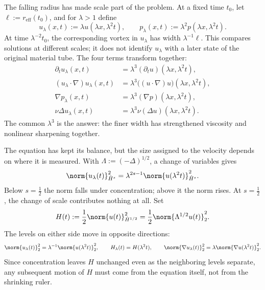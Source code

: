 
The falling radius has made scale part of the problem.
At a fixed time \(t_0\), let \(\ell:=r_{\mathrm{eff}}(t_0)\), and for \(\lambda>1\) define
\[
  u_\lambda(x,t)
  :=
  \lambda u(\lambda x,\lambda^2t),
  \qquad
  p_\lambda(x,t)
  :=
  \lambda^2p(\lambda x,\lambda^2t).
\]
At time \(\lambda^{-2}t_0\), the corresponding vortex in \(u_\lambda\) has width \(\lambda^{-1}\ell\).
This compares solutions at different scales; it does not identify \(u_\lambda\) with a later state of the original material tube.
The four terms transform together:
\[
\begin{aligned}
  \partial_tu_\lambda(x,t)
  &=
  \lambda^3(\partial_tu)(\lambda x,\lambda^2t),
  \\
  (u_\lambda\cdot\nabla)u_\lambda(x,t)
  &=
  \lambda^3\bigl((u\cdot\nabla)u\bigr)(\lambda x,\lambda^2t),
  \\
  \nabla p_\lambda(x,t)
  &=
  \lambda^3(\nabla p)(\lambda x,\lambda^2t),
  \\
  \nu\Delta u_\lambda(x,t)
  &=
  \lambda^3\nu(\Delta u)(\lambda x,\lambda^2t).
\end{aligned}
\]
The common \(\lambda^3\) is the answer: the finer width has strengthened viscosity and nonlinear sharpening together.


The equation has kept its balance, but the size assigned to the velocity depends on where it is measured.
With \(\Lambda:=(-\Delta)^{1/2}\), a change of variables gives
\[
  \norm{u_\lambda(t)}_{\dot H^s}^2
  =
  \lambda^{2s-1}
  \norm{u(\lambda^2t)}_{\dot H^s}^2.
\]
Below \(s=\tfrac12\) the norm falls under concentration; above it the norm rises.
At \(s=\tfrac12\), the change of scale contributes nothing at all.
Set
\[
  H(t)
  :=
  \frac12\norm{u(t)}_{\dot H^{1/2}}^2
  =
  \frac12\norm{\Lambda^{1/2}u(t)}_2^2.
\]
The levels on either side move in opposite directions:
\[
  \norm{u_\lambda(t)}_2^2
  =
  \lambda^{-1}\norm{u(\lambda^2t)}_2^2,
  \qquad
  H_\lambda(t)=H(\lambda^2t),
  \qquad
  \norm{\nabla u_\lambda(t)}_2^2
  =
  \lambda\norm{\nabla u(\lambda^2t)}_2^2.
\]
Since concentration leaves \(H\) unchanged even as the neighboring levels separate, any subsequent motion of \(H\) must come from the equation itself, not from the shrinking ruler.


